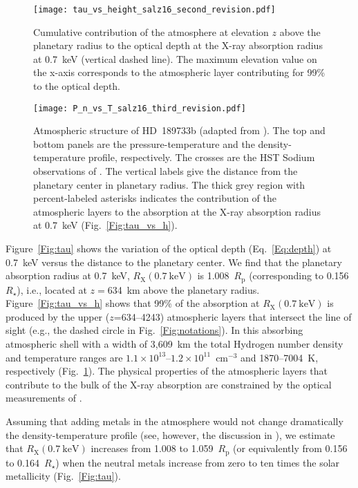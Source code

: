 \documentclass[iop]{emulateapj}
\begin{document}
\begin{figure}[!t]
\centering
  \texttt{[image: tau\_vs\_height\_salz16\_second\_revision.pdf]}
  \caption{Cumulative contribution of the atmosphere at elevation $z$
	  above the planetary radius to the optical depth at the X-ray absorption 
	  radius at 0.7~keV (vertical dashed line). The maximum elevation 
	  value on the x-axis corresponds to the atmospheric layer contributing 
	  for 99\% to the optical depth.}
   \label{Fig:tau_vs_h}
\medskip
  \texttt{[image: P\_n\_vs\_T\_salz16\_third\_revision.pdf]}
  \caption{Atmospheric structure of HD~189733b (adapted from 
	  \citealt{Salz2016}). The top and bottom panels are the 
	  pressure-temperature and the density-temperature profile,
	  respectively. The crosses are the HST Sodium observations 
	  of \citet{Huitson2012}. The vertical labels give 
	  the distance from the planetary center in
	  planetary radius. The thick grey 
	  region with percent-labeled asterisks indicates 
	  the contribution of the atmospheric layers
	  to the absorption at the X-ray absorption 
	  radius at 0.7~keV (Fig.~\ref{Fig:tau_vs_h}).}
   \label{Fig:P_n_vs_T}
\end{figure} 



Figure~\ref{Fig:tau} shows the variation of the optical depth (Eq.~\ref{Eq:depth}) at 0.7~keV versus 
the distance to the planetary center. We find that the planetary absorption radius at 0.7~keV, $R_\mathrm{X}(\mathrm{0.7~keV})$ 
is 1.008~$R_\mathrm{p}$ (corresponding to 0.156~$R_\star$), i.e., located at $z=$634~km
above the planetary radius. Figure~\ref{Fig:tau_vs_h} shows that 99\% of the absorption at 
$R_\mathrm{X}(\mathrm{0.7~keV})$ is produced by the upper ($z$=634--4243) atmospheric layers that intersect 
the line of sight (e.g., the dashed circle in Fig.~\ref{Fig:notations}). In this absorbing atmospheric 
shell with a width of 3,609~km the total Hydrogen number density and temperature ranges are 
$ 1.1\times10^{13}$--$ 1.2\times10^{11}$~cm$^{-3}$ and 1870--7004~K, respectively 
(Fig.~\ref{Fig:P_n_vs_T}). The physical properties of the atmospheric layers that contribute to the
bulk of the X-ray absorption are constrained by the optical measurements of \cite{Huitson2012}.

Assuming that adding metals in the atmosphere would not change dramatically the density-temperature profile 
(see, however, the discussion in \citealt{Salz2016}), we estimate that $R_\mathrm{X}(\mathrm{0.7~keV})$ increases 
from 1.008 to 1.059~$R_\mathrm{p}$ (or equivalently from 0.156 to 0.164~$R_\star$) when the neutral 
metals increase from zero to ten times the solar metallicity (Fig.~\ref{Fig:tau}). 
\end{document}
